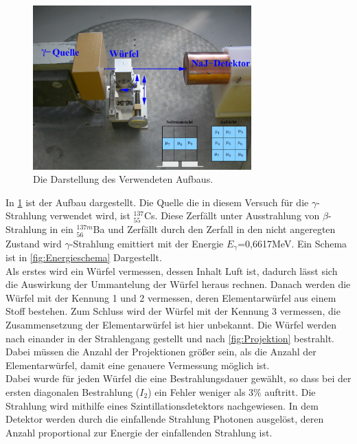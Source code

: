 \begin{figure}[h!]
\centering
\includegraphics[width = 0.75\textwidth]{../Grafiken/Aufbau.pdf}
\caption{Die Darstellung des Verwendeten Aufbaus.}\label{fig:Aufbau}
\end{figure}
In \cref{fig:Aufbau} ist der Aufbau dargestellt.
Die Quelle die in diesem Versuch für die $\gamma$-Strahlung verwendet wird, ist ${}^{137}_{55}$Cs.
Diese Zerfällt unter Ausstrahlung von $\beta$-Strahlung in ein ${}^{137m}_{56}$Ba und Zerfällt durch den Zerfall in den nicht angeregten Zustand wird $\gamma$-Strahlung emittiert mit der Energie $E_\gamma$=0,6617MeV. Ein Schema ist in \cref{fig:Energieschema} Dargestellt.\\
Als erstes wird ein Würfel vermessen, dessen Inhalt Luft ist, dadurch lässt sich die Auswirkung der Ummantelung der Würfel heraus rechnen.
Danach werden die Würfel mit der Kennung 1 und 2 vermessen, deren Elementarwürfel aus einem Stoff bestehen.
Zum Schluss wird der Würfel mit der Kennung 3 vermessen, die Zusammensetzung der Elementarwürfel ist hier unbekannt. 
Die Würfel werden nach einander in der Strahlengang gestellt und nach \cref{fig:Projektion} bestrahlt.
Dabei müssen die Anzahl der Projektionen größer sein, als die Anzahl der Elementarwürfel, damit eine genauere Vermessung möglich ist.\\
Dabei wurde für jeden Würfel die eine Bestrahlungsdauer gewählt, so dass bei der ersten diagonalen Bestrahlung ($I_2$) ein Fehler weniger als $3\%$ auftritt.
Die Strahlung wird mithilfe eines Szintillationsdetektors nachgewiesen.
In dem Detektor werden durch die einfallende Strahlung Photonen ausgelöst, deren Anzahl proportional zur Energie der einfallenden Strahlung ist.

